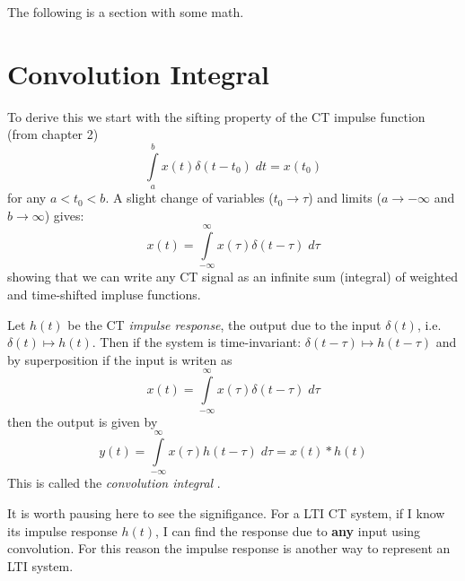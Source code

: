 \documentclass{article}
\begin{document}
The following is a section with some math.

\section{Convolution Integral}

To derive this we start with the sifting property of the CT impulse function (from chapter 2)
\[
\int\limits_{a}^{b} x(t)\delta(t-t_0) \; dt = x(t_0)
\]
for any $a < t_0 < b$. A slight change of variables ($t_0 \rightarrow \tau$) and limits ($a \rightarrow -\infty$ and $b \rightarrow \infty$) gives:
\[
x(t) = \int\limits_{-\infty}^{\infty} x(\tau)\delta(t-\tau) \; d\tau
\]
showing that we can write any CT signal as an infinite sum (integral) of weighted and time-shifted impluse functions.

Let $h(t)$ be the CT {\it impulse response}, the output due to the input $\delta(t)$, i.e. $\delta(t) \mapsto h(t)$. Then if the system is time-invariant: $\delta(t-\tau) \mapsto h(t-\tau)$ and by superposition if the input is writen as
\[
x(t) = \int\limits_{-\infty}^{\infty} x(\tau)\delta(t-\tau) \; d\tau
\]
then the output is given by
\[
  y(t) = \int\limits_{-\infty}^{\infty} x(\tau)h(t-\tau) \; d\tau = x(t) * h(t)
\]
This is called the \emph{convolution integral} .

It is worth pausing here to see the signifigance. For a LTI CT system, if I know its impulse response $h(t)$, I can find the response due to \textbf{any} input using convolution. For this reason the impulse response is another way to represent an LTI system.
\end{document}
